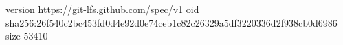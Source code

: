 version https://git-lfs.github.com/spec/v1
oid sha256:26f540c2bc453fd0d4e92d0e74ceb1c82c26329a5df3220336d2f938cb0d6986
size 53410
